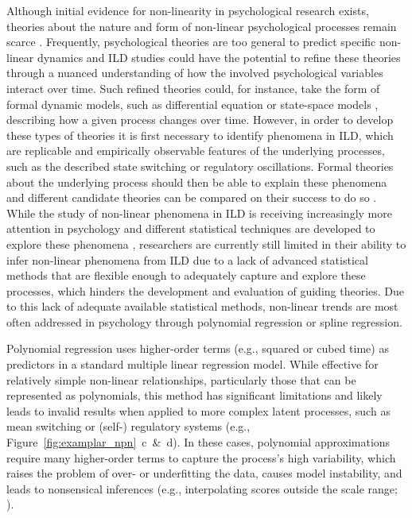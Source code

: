 \documentclass[man, floatsintext]{apa7}
\begin{document}
Although initial evidence for non-linearity in psychological research exists,
theories about the nature and form of non-linear psychological processes remain
scarce \parencite{tan_time-varying_2011}. Frequently, psychological theories
are too general \parencite{oberauer_addressing_2019} to predict specific
non-linear dynamics and ILD studies could have the
potential to refine these theories through a nuanced understanding of how the
involved psychological variables interact over time. Such refined
theories could, for instance, take the form of formal dynamic models, such as
differential equation \parencite{cooper_dynamical_2012} or state-space models
\parencite{durbin_time_2012}, describing how a given process changes over time.
However, in order to develop these types of theories it is first necessary to
identify phenomena in ILD, which are replicable and empirically observable
features of the underlying processes, such as the described state switching or
regulatory oscillations. Formal theories about the underlying process should
then be able to explain these phenomena and different candidate theories can be
compared on their success to do so \parencite{borsboom_theory_2021}. While the
study of non-linear phenomena in ILD is receiving increasingly more attention
in psychology and different statistical techniques are developed to explore
these phenomena \parencite{cui_unlocking_2023,humberg_estimating_2024},
researchers are currently still limited in their ability to infer non-linear
phenomena from ILD due to a lack of advanced statistical methods that are
flexible enough to adequately capture and explore these processes, which
hinders the development and evaluation of guiding theories. Due to this lack of
adequate available statistical methods, non-linear trends are most often
addressed in psychology through polynomial regression or spline regression.

Polynomial regression \parencite{jebb_time_2015} uses higher-order terms (e.g.,
squared or cubed time) as predictors in a standard multiple linear regression
model. While effective for relatively simple non-linear relationships,
particularly those that can be represented as polynomials, this method has
significant limitations and likely leads to invalid results when applied to
more complex latent processes, such as mean switching or (self-) regulatory
systems (e.g., Figure~\ref{fig:examplar_npn}~c~\&~d). In these cases,
polynomial approximations require many higher-order terms to capture the
process's high variability, which raises the problem of over- or underfitting
the data, causes model instability, and leads to nonsensical inferences (e.g.,
interpolating scores outside the scale range;
\textcite{boyd_divergence_2009,harrell_general_2001}).
\end{document}
